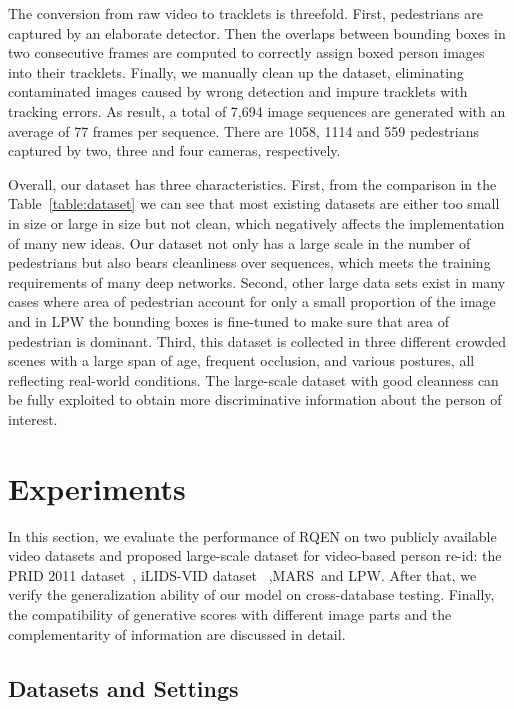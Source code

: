 \documentclass[letterpaper]{article} %
\begin{document}
The conversion from raw video to tracklets is threefold. First, pedestrians are captured by an elaborate detector. Then the overlaps between bounding boxes in two consecutive frames are computed to correctly assign boxed person images into their tracklets. Finally, we manually clean up the dataset, eliminating contaminated images caused by wrong detection and impure tracklets with tracking errors. As result, a total of 7,694 image sequences are generated with an average of 77 frames per sequence.
There are 1058, 1114 and 559 pedestrians captured by two, three and four cameras, respectively.

Overall, our dataset has three characteristics. First, from the comparison in the Table~\ref{table:dataset} we can see that most existing datasets are either too small in size or large in size but not clean, which negatively affects the implementation of many new ideas. Our dataset not only has a large scale in the number of pedestrians but also bears cleanliness over sequences, which meets the training requirements of many deep networks. Second, other large data sets exist in many cases where area of pedestrian account for only a small proportion of the image and in LPW the bounding boxes is fine-tuned to make sure that area of pedestrian is dominant. Third, this dataset is collected in three different crowded scenes with a large span of age, frequent occlusion, and various postures, all reflecting real-world conditions. The large-scale dataset with good cleanness can be fully exploited to obtain more discriminative information about the person of interest.


\section{Experiments}

In this section, we evaluate the performance of RQEN on two publicly available video datasets and proposed large-scale dataset for video-based person re-id: the PRID 2011 dataset~\cite{hirzer2011person}, iLIDS-VID dataset~\cite{wang2014person} ,MARS~\cite{zheng2016mars}and LPW. After that, we verify the generalization ability of our model on cross-database testing. Finally, the compatibility of generative scores with different image parts and the complementarity of information are discussed in detail.

\subsection{Datasets and Settings}
\end{document}
